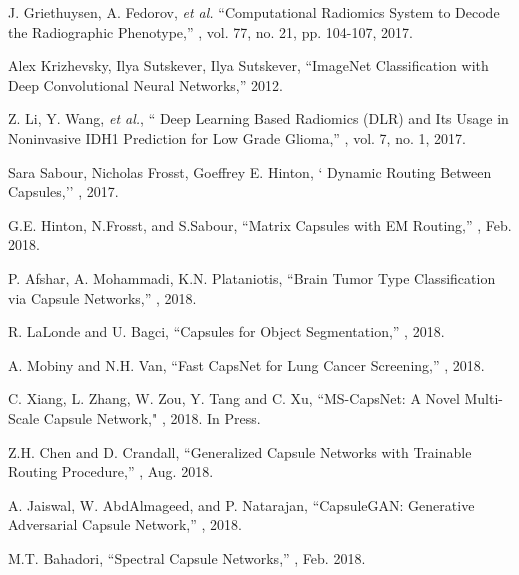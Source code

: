 \documentclass{article}
\begin{document}
\begin{thebibliography}{10}
J. Griethuysen, A. Fedorov, {\em et al.}
\newblock ``Computational Radiomics System to Decode the Radiographic Phenotype,''
, vol. 77, no. 21, pp. 104-107, 2017.

Alex Krizhevsky, Ilya Sutskever, Ilya Sutskever,
\newblock 	``ImageNet Classification with Deep Convolutional Neural Networks,''
 2012.

Z. Li, Y. Wang, {\em et al.},
\newblock `` Deep Learning Based Radiomics (DLR) and Its Usage in Noninvasive IDH1 Prediction for Low Grade Glioma,''
, vol. 7, no. 1, 2017.

Sara Sabour, Nicholas Frosst, Goeffrey E. Hinton,
\newblock ` Dynamic Routing Between Capsules,''
, 2017.

G.E. Hinton, N.Frosst, and S.Sabour,
\newblock ``Matrix Capsules with EM Routing,''
, Feb. 2018.

P. Afshar, A. Mohammadi, K.N. Plataniotis,
\newblock ``Brain Tumor Type Classification via Capsule Networks,''
, 2018.

R. LaLonde and U. Bagci,
\newblock ``Capsules for Object Segmentation,''
, 2018.

A. Mobiny and N.H. Van,
\newblock ``Fast CapsNet for Lung Cancer Screening,''
, 2018.


C. Xiang, L. Zhang, W. Zou, Y. Tang and C. Xu,
\newblock ``MS-CapsNet: A Novel Multi-Scale Capsule Network,"
, 2018. In Press.

Z.H. Chen and D. Crandall,
\newblock ``Generalized Capsule Networks with Trainable Routing Procedure,''
, Aug. 2018.

A. Jaiswal, W. AbdAlmageed, and P. Natarajan,
\newblock ``CapsuleGAN: Generative Adversarial Capsule Network,''
, 2018.

M.T. Bahadori,
\newblock ``Spectral Capsule Networks,''
, Feb. 2018.


\end{thebibliography}
\end{document}
